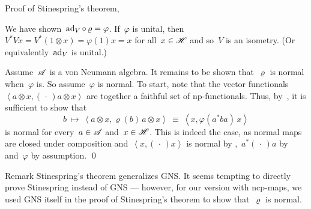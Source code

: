 \documentclass[b]{subfiles}
\begin{document}
\begin{parsec}
\begin{point}
\begin{point}{%
    Proof of Stinespring's theorem, }
\begin{point}
We have shown~$\mathrm{ad}_V \mathop{\circ} \varrho = \varphi$.
    If~$\varphi$ is unital,
    then~$V^*Vx = V^* (1\otimes x) = \varphi(1)x=x$
        for all~$x \in \mathscr{H}$ and so~$V$ is an isometry.
    (Or equivalently~$\mathrm{ad}_V$ is unital.)
\end{point}
\begin{point}%
Assume~$\mathscr{A}$ is a von Neumann algebra.
It remains to be shown that~$\varrho$
    is normal when~$\varphi$ is.
So assume~$\varphi$ is normal.
To start, note that
    the vector functionals~$\left< a\otimes x, (\,\cdot\,) a\otimes x\right>$
    are together a faithful set of np-functionals.
Thus, by~,
    it is sufficient
    to show that
\begin{equation*}
    b \ \mapsto \ \left<a \otimes x, \varrho(b) \, a \otimes x \right>
    \ \equiv \ \left<x, \varphi(a^* b a) \,x \right>
\end{equation*}
    is normal for every~$a\in \mathscr{A}$ and~$x \in \mathscr{H}$.
    This is indeed the case, as normal
    maps are closed under composition and~$\left<x, (\,\cdot\,) x\right>$
    is normal by ,~$a^* (\,\cdot\,) a$ by 
    and~$\varphi$ by assumption.
        \qed
\end{point}
\end{point}
\begin{point}{Remark}%
Stinespring's theorem generalizes GNS.
It seems tempting to directly prove Stinespring instead of GNS ---
however, for our version with ncp-maps,
we used GNS itself in the proof of Stinespring's theorem to show
that~$\varrho$ is normal.
\end{point}
\end{point}
\end{parsec}
\end{document}
